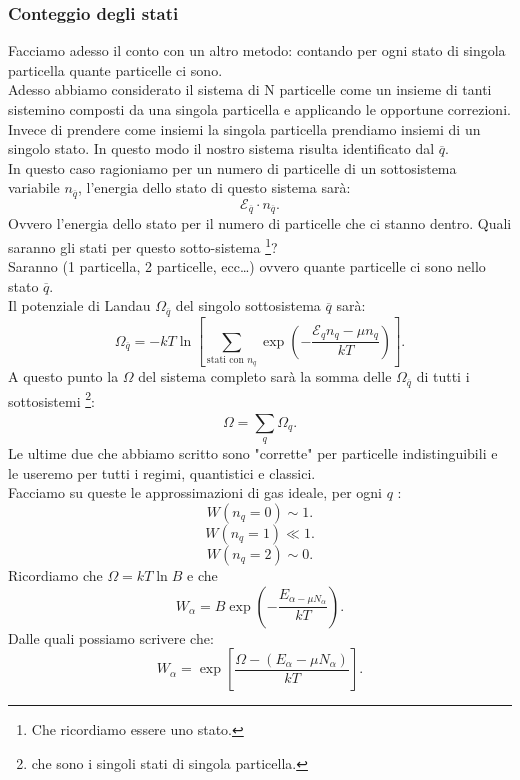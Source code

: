 \subsubsection{Conteggio degli stati}%
\label{subsub:Conteggio degli stati}
Facciamo adesso il conto con un altro metodo: contando per ogni stato di singola particella quante particelle ci sono.\\
Adesso abbiamo considerato il sistema di N particelle come un insieme di tanti sistemino composti da una singola particella e applicando le opportune correzioni. Invece di prendere come insiemi la singola particella prendiamo insiemi di un singolo stato. In questo modo il nostro sistema risulta identificato dal $\overline{q}$.\\
In questo caso ragioniamo per un numero di particelle di un sottosistema variabile $n_{\overline{q}}$, l'energia dello stato di questo sistema sarà:
\[
	 \mathcal{E}_{\overline{q}}\cdot n_{\overline{q}}
.\] 
Ovvero l'energia dello stato per il numero di particelle che ci stanno dentro. Quali saranno gli stati per questo sotto-sistema \footnote{Che ricordiamo essere uno stato.}?\\
Saranno (1 particella, 2 particelle, ecc\ldots) ovvero quante particelle ci sono nello stato  $\overline{q}$.\\
Il potenziale di Landau $\Omega_{\overline{q}}$ del singolo sottosistema $\overline{q}$ sarà:
\[
	\Omega_{\overline{q}} = - kT 
	\ln \left[ \sum_{\text{stati con $n_{q}$}}^{} \exp\left( -\frac{\mathcal{E}_{q}n_{q}-\mu n_{q}}{kT} \right) 
\right] .\] \label{eq:Landau_gas_ideale}
A questo punto la $\Omega$ del sistema completo sarà la somma delle $\Omega_{\overline{q}}$ di tutti i sottosistemi \footnote{che sono i singoli stati di singola particella.}:
\[
	\Omega = \sum_{q}^{} \Omega_{q}
.\] 
Le ultime due che abbiamo scritto sono "corrette" per particelle indistinguibili e le useremo per tutti i regimi, quantistici e classici.\\ 
Facciamo su queste le approssimazioni di gas ideale, per ogni $q$ :
\[
	W\left( n_{q}=0 \right) \sim 1 
.\] 
\[
	W\left( n_{q}=1 \right) \ll 1
.\] 
\[
	W\left( n_{q}=2 \right) \sim 0
.\] 
Ricordiamo che $\Omega = kT \ln B$ e che
\[
	W_{\alpha}= B \exp\left( -\frac{E_{\alpha-\mu N_{\alpha}}}{kT} \right) 
.\] 
Dalle quali possiamo scrivere che:
\[
	W_{\alpha} = \exp\left[ \frac{\Omega-\left( E_{\alpha}-\mu N_{\alpha} \right) }{kT} \right] 
.\] 

